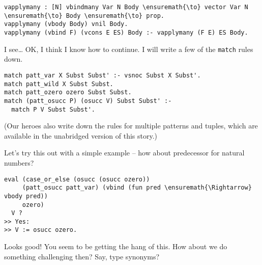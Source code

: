 \begin{verbatim}
vapplymany : [N] vbindmany Var N Body \ensuremath{\to} vector Var N \ensuremath{\to} Body \ensuremath{\to} prop.
vapplymany (vbody Body) vnil Body.
vapplymany (vbind F) (vcons E ES) Body :- vapplymany (F E) ES Body.
\end{verbatim}

\heroSTUDENT{} I see\ldots{} OK, I think I know how to continue. I will write
a few of the \texttt{match} rules down.

\begin{verbatim}
match patt_var X Subst Subst' :- vsnoc Subst X Subst'.
match patt_wild X Subst Subst.
match patt_ozero ozero Subst Subst.
match (patt_osucc P) (osucc V) Subst Subst' :-
  match P V Subst Subst'.
\end{verbatim}

\begin{scenecomment}
(Our heroes also write down the rules for multiple patterns and tuples, which are
available in the unabridged version of this story.)
\end{scenecomment}

\heroSTUDENT{} Let's try this out with a simple example -- how about
predecessor for natural numbers?

\begin{verbatim}
eval (case_or_else (osucc (osucc ozero))
     (patt_osucc patt_var) (vbind (fun pred \ensuremath{\Rightarrow} vbody pred))
     ozero)
  V ?
>> Yes:
>> V := osucc ozero.
\end{verbatim}

\heroADVISOR{} Looks good! You seem to be getting the hang of this. How about
we do something challenging then? Say, type synonyms?

\heroNEEDFEEDBACK{}
